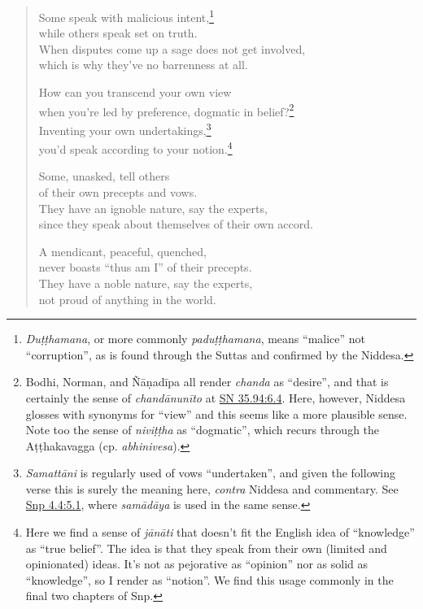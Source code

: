 \documentclass[12pt,openany]{book}%
\begin{document}
\begin{verse}%
Some speak with malicious intent,\footnote{\textit{\textsanskrit{Duṭṭhamana}}, or more commonly \textit{\textsanskrit{paduṭṭhamana}}, means “malice” not “corruption”, as is found through the Suttas and confirmed by the Niddesa. } \\
while others speak set on truth. \\
When disputes come up a sage does not get involved, \\
which is why they’ve no barrenness at all. 

How can you transcend your own view \\
when you’re led by preference, dogmatic in belief?\footnote{Bodhi, Norman, and \textsanskrit{Ñāṇadīpa} all render \textit{chanda} as “desire”, and that is certainly the sense of \textit{\textsanskrit{chandānunīto}} at \href{https://suttacentral.net/sn35.94/en/sujato\#6.4}{SN 35.94:6.4}. Here, however, Niddesa glosses with synonyms for “view” and this seems like a more plausible sense. Note too the sense of \textit{\textsanskrit{niviṭṭha}} as “dogmatic”, which recurs through the \textsanskrit{Aṭṭhakavagga} (cp. \textit{abhinivesa}). } \\
Inventing your own undertakings,\footnote{\textit{\textsanskrit{Samattāni}} is regularly used of vows “undertaken”, and given the following verse this is surely the meaning here, \emph{contra} Niddesa and commentary. See \href{https://suttacentral.net/snp4.4/en/sujato\#5.1}{Snp 4.4:5.1}, where \textit{\textsanskrit{samādāya}} is used in the same sense. } \\
you’d speak according to your notion.\footnote{Here we find a sense of \textit{\textsanskrit{jānāti}} that doesn’t fit the English idea of “knowledge” as “true belief”. The idea is that they speak from their own (limited and opinionated) ideas. It’s not as pejorative as “opinion” nor as solid as “knowledge”, so I render as “notion”. We find this usage commonly in the final two chapters of Snp. } 

Some, unasked, tell others \\
of their own precepts and vows. \\
They have an ignoble nature, say the experts, \\
since they speak about themselves of their own accord. 

A mendicant, peaceful, quenched, \\
never boasts “thus am I” of their precepts. \\
They have a noble nature, say the experts, \\
not proud of anything in the world. 


\end{verse}
\end{document}

